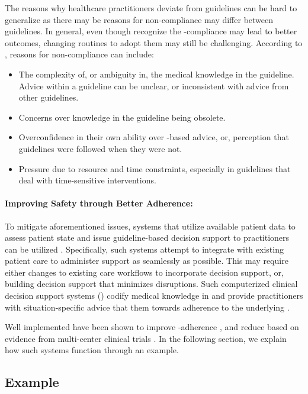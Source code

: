 The reasons why healthcare practitioners deviate from guidelines
can be hard to generalize as there may be reasons for non-compliance
may differ between guidelines. In general, even though \HCPs{}
recognize the \BPGs{}-compliance may lead to better outcomes, changing
routines to adopt them may still be challenging. According to
\cite{BarthCCLM16}, reasons for non-compliance can include:
\begin{itemize}
  \item The complexity of, or ambiguity in, the medical knowledge in the
    guideline. Advice within a guideline can be unclear, or inconsistent
    with advice from other guidelines.
  \item Concerns over knowledge in the guideline being obsolete.
  \item Overconfidence in their own ability over \BPG{}-based advice, or,
        perception that guidelines were followed when they were not.
  \item Pressure due to resource and time constraints, especially in guidelines
    that deal with time-sensitive interventions.
\end{itemize}

\paragraph{Improving Safety through Better Adherence:}

To mitigate aforementioned issues, systems that utilize available
patient data to assess patient state and issue guideline-based
decision support to practitioners can be utilized \cite{DeClerqSHTI08}.
Specifically, such systems attempt to integrate with existing patient care
to administer support as seamlessly as possible. This may require
either changes to existing care workflows to incorporate decision support,
or, building decision support that minimizes disruptions.
Such computerized clinical decision support systems (\CDSSs{}) codify
medical knowledge in \BPGs{} and provide practitioners with
situation-specific advice that  them towards adherence
to the underlying \BPG{}.

Well implemented \CDSSs{} have been shown to improve
\BPG{}-adherence \cite{GargJAMA06,KawamotoBMJ05}, and reduce
\PMEs{} based on evidence from multi-center clinical trials \cite{BenettJAMIA16,SahotaJIS11}.
In the following section, we explain how such systems function through an
example.

\subsection{\CDSS{} Example}\label{sec:cdss-example}

